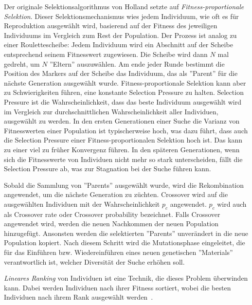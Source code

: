 \documentclass{article}
\begin{document}
Der originale Selektionsalgorithmus von Holland  setzte auf \textit{Fitness-proportionale Selektion}. Dieser Selektionsmechanismus wies jedem Individuum, wie oft es für Reproduktion ausgewählt wird, basierend auf der Fitness des jeweiligen Individuums im Vergleich zum Rest der Population. Der Prozess ist analog zu einer Roulettescheibe: Jedem Individuum wird ein Abschnitt auf der Scheibe entsprechend seinem Fitnesswert zugewiesen. Die Scheibe wird dann $N$ mal gedreht, um $N$ ''Eltern'' auszuwählen. Am ende jeder Runde bestimmt die Position des Markers auf der Scheibe das Individuum, das als ''Parent'' für die nächste Generation ausgewählt wurde. Fitness-proportionale Selektion kann aber zu Schwierigkeiten führen, eine konstante Selection Pressure zu halten. Selection Pressure ist die Wahrscheinlichkeit, dass das beste Individuum ausgewählt wird im Vergleich zur durchschnittlichen Wahrscheinlichkeit aller Individuen, ausgewählt zu werden. In den ersten Generationen einer Suche die Varianz von Fitnesswerten einer Population ist typischerweise hoch, was dazu führt, dass auch die Selection Pressure einer Fitness-proportionalen Selektion hoch ist. Das kann zu einer viel zu früher Konvergenz führen. In den späteren Generationen, wenn sich die Fitnesswerte von Individuen nicht mehr so stark unterscheiden, fällt die Selection Pressure ab, was zur Stagnation bei der Suche führen kann. 

Sobald die Sammlung von ''Parents'' ausgewählt wurde, wird die Rekombination angewendet, um die nächste Generation zu züchten. Crossover wird auf die ausgewählten Individuen mit der Wahrscheinlichkeit $p_c$ angewendet. $p_c$ wird auch als Crossover rate oder Crossover probability bezeichnet. Falls Crossover angewendet wird, werden die neuen Nachkommen der neuen Population hinzugefügt. Ansonsten werden die selektierten ''Parents'' unverändert in die neue Population kopiert. Nach diesem Schritt wird die Mutationsphase eingeleitet, die für das Einführen bzw. Wiedereinführen eines neuen genetischen ''Materials'' verantwortlich ist, welcher Diversität der Suche erhöhen soll. 

\textit{Lineares Ranking} von Individuen ist eine Technik, die dieses Problem überwinden kann. Dabei werden Individuen nach ihrer Fitness sortiert, wobei die besten Individuen nach ihrem Rank ausgewählt werden~\cite{whitley1989genitor}. 
\end{document}
